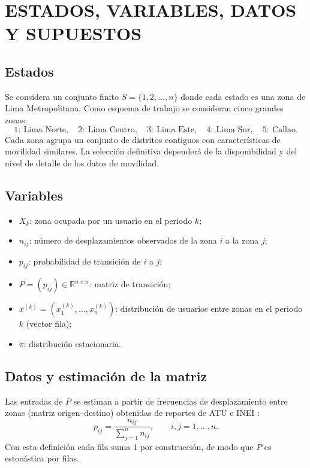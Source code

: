 \documentclass[12pt]{article}
\begin{document}
\newpage
\section{ESTADOS, VARIABLES, DATOS Y SUPUESTOS}

\subsection{Estados}
Se considera un conjunto finito $S=\{1,2,\ldots,n\}$ donde cada estado es una zona de Lima
Metropolitana. Como esquema de trabajo se consideran cinco grandes zonas:
\[
    1:\ \text{Lima Norte},\quad 2:\ \text{Lima Centro},\quad 3:\ \text{Lima Este},\quad
    4:\ \text{Lima Sur},\quad 5:\ \text{Callao}.
\]
Cada zona agrupa un conjunto de distritos contiguos con características de movilidad similares. La selección definitiva dependerá de la disponibilidad y del nivel de detalle de los datos de movilidad.

\subsection{Variables}
\begin{itemize}
    \item $X_k$: zona ocupada por un usuario en el periodo $k$;
    \item $n_{ij}$: número de desplazamientos observados de la zona $i$ a la zona $j$;
    \item $p_{ij}$: probabilidad de transición de $i$ a $j$;
    \item $P=(p_{ij})\in\mathbb{R}^{n\times n}$: matriz de transición;
    \item $x^{(k)}=(x^{(k)}_1,\ldots,x^{(k)}_n)$: distribución de usuarios entre zonas en el
          periodo $k$ (vector fila);
    \item $\pi$: distribución estacionaria.
\end{itemize}

\subsection{Datos y estimación de la matriz}
Las entradas de $P$ se estiman a partir de frecuencias de desplazamiento entre zonas (matriz
origen--destino) obtenidas de reportes de ATU e INEI \cite{atu,inei}:
\[
    p_{ij}=\frac{n_{ij}}{\sum_{j=1}^{n} n_{ij}},\qquad i,j=1,\ldots,n.
\]
Con esta definición cada fila suma 1 por construcción, de modo que $P$ es estocástica por filas.
\end{document}

